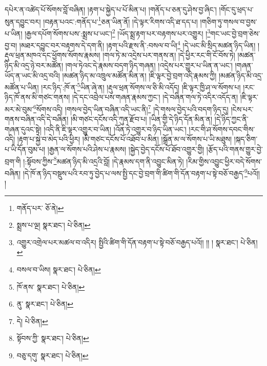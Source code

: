 དཔེར་ན་འཚེད་པོ་སོགས་བློ་བཞིན། །རྟག་པ་སྐྱེད་པ་པོ་མིན་པ། །གནོད་པ་ཅན་དུ་ཤེས་བྱ་ཞིང་། །གོང་དུ་ཕྲད་པ་སུན་དབྱུང་བར། །བརྟན་པའང་:གནོད་པ་\footnote{གནོད་པར་  ཅོ་ནེ། }ཅན་ཡིན་ནོ། །དེ་ལྟར་རིགས་འདི་ཐ་དད་པ། །གཅིག་ཏུ་གསལ་བ་བྱས་པ་ཡིན། །རྒྱལ་དཔོག་སོགས་པས་:སྨྲས་པ་ཡང་།\footnote{སྨྲས་པ་ལྔ།  སྣར་ཐང་།  པེ་ཅིན། } །ཡོད་སྨྲ་རྟག་པར་བརྟགས་པར་འགྱུར། །\footnote{འགྱུར་འགྲེལ་པར་མཚལ་བ་འདིར། སྤྱིའི་ཚིག་གི་དོན་བརྟག་པ་སྟེ་བཅོ་བརྒྱད་པའོ།། །། །  སྣར་ཐང་།  པེ་ཅིན། }གང་ཡང་བྱེ་བྲག་ཅེས་བྱ་བ། །མཐར་དབྱུང་བར་བརྟགས་དེ་དག་ནི། །རྟག་པའི་རྫས་ནི་:བསལ་བ་ཡི།\footnote{བསལ་བ་ཡིས།  སྣར་ཐང་།  པེ་ཅིན། } །དེ་ཡང་མི་སྲིད་མཚན་ཉིད་ཡིན། །རྡུལ་ཕྲན་མཁའ་དང་ཕྱོགས་སོགས་རྣམས། །གལ་ཏེ་མ་འདྲེས་པར་གནས་ན། །དེ་ཕྱིར་རང་གི་ངོ་བོས་ཏེ། །མཚན་ཉིད་མི་འདྲ་ཉེ་བར་མཚོན། །གལ་ཏེའང་དེ་རྣམས་བདག་ཉིད་གཞན། །འདྲེས་པར་གྱུར་པ་ཡིན་ན་ཡང་། །གཞན་ཡོད་ན་ཡང་མི་འདྲ་བའི། །མཚན་ཉིད་མ་འཁྲུལ་མཚོན་མིན་ན། །ཇི་ལྟར་བྱེ་བྲག་འདི་རྣམས་ཀྱི། །མཚན་ཉིད་མི་འདྲ་མཚོན་པ་ཡིན། །རང་ཉིད་:ཁོ་ན་\footnote{ཁོ་ནས་  སྣར་ཐང་།  པེ་ཅིན། }ཡིན་ཞེ་ན། །རྡུལ་ཕྲན་སོགས་ལ་ཅི་མི་འདོད། །ཇི་ལྟར་ཁྱི་ཤ་ལ་སོགས་པ། །རང་ཉིད་ཁོ་ནས་མི་གཙང་གནས། །དེ་དང་འབྲེལ་པས་གཞན་རྣམས་ཀྱང་། །དེ་བཞིན་གལ་ཏེ་འདིར་འདོད་ན། །ཇི་ལྟར་མར་མེ་བུམ་\footnote{ནུ་  སྣར་ཐང་།  པེ་ཅིན། }སོགས་འདི། །གསལ་བྱེད་ཡིན་བཞིན་འདི་ཡང་ནི།\footnote{དེ།  པེ་ཅིན། } །དེ་གསལ་བྱེད་པའི་བདག་ཉིད་དུ། །ངེས་པར་གནས་བཞིན་འདི་དེ་བཞིན། །མི་གཙང་དངོས་འདི་ཀུན་རྫོབ་པ། །ཡིན་གྱི་དེ་ཉིད་དོན་མིན་ན། །དེ་ཉིད་ཀྱང་ནི་གཞན་དུའང་སྟེ། །འདི་ནི་ཇི་ལྟར་འགྱུར་བ་ཡིན། །འོན་ཏེ་འགྱུར་བ་ཉིད་ཡིན་ཡང་། །རང་གི་ཤ་སོགས་དབང་གིས་འདི། །རྟག་པ་སྐྱེ་བ་མེད་པའི་ཕྱིར། །མི་གཙང་དངོས་པོ་འཐོབ་པ་མིན། །སྒྲོན་མ་ལ་སོགས་པ་ཡི་མཐུས། །སྐད་ཅིག་པ་ཡི་དོན་བུམ་པ། །རྒྱན་ལ་སོགས་པའི་ཤེས་པ་རྣམས། །སྐྱེད་བྱེད་དངོས་པོ་ཐོབ་འགྱུར་གྱི། །རྩོད་པའི་གནས་གྱུར་བྱེ་བྲག་གི །:སྟོབས་ཀྱིས་\footnote{སྟོབས་ཀྱི་  སྣར་ཐང་།  པེ་ཅིན། }མཚན་ཉིད་མི་འདྲའི་བློ། །དེ་རྣམས་དག་ནི་འབྱུང་མིན་ཏེ། །རིམ་གྱིས་འབྱུང་ཕྱིར་བདེ་སོགས་བཞིན། །དེ་ཁོ་ན་ཉིད་བསྡུས་པའི་རབ་ཏུ་བྱེད་པ་ལས་སྤྱི་དང་བྱེ་བྲག་གི་ཚིག་གི་དོན་བརྟག་པ་སྟེ་བཅོ་བརྒྱད་\footnote{བཅུ་དགུ་  སྣར་ཐང་།  པེ་ཅིན། }པའོ།། །
